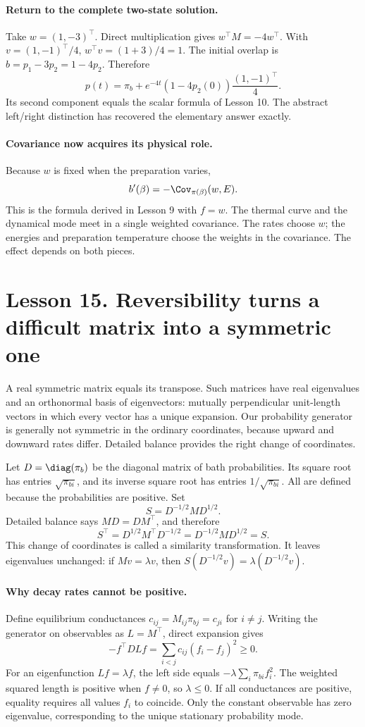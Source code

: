 \paragraph{Return to the complete two-state solution.}
Take $w=(1,-3)^\top$. Direct multiplication gives $w^\top M=-4w^\top$.
With $v=(1,-1)^\top/4$, $w^\top v=(1+3)/4=1$. The initial overlap is
$b=p_1-3p_2=1-4p_2$. Therefore
\[
p(t)=\pi_b+e^{-4t}(1-4p_2(0))\frac{(1,-1)^\top}{4}.
\]
Its second component equals the scalar formula of Lesson 10. The abstract
left/right distinction has recovered the elementary answer exactly.

\paragraph{Covariance now acquires its physical role.}
Because $w$ is fixed when the preparation varies,
\[
b'(\beta)=-\Cov_{\pi(\beta)}(w,E).
\]
This is the formula derived in Lesson 9 with $f=w$. The thermal curve and the
dynamical mode meet in a single weighted covariance. The rates choose $w$;
the energies and preparation temperature choose the weights in the covariance.
The effect depends on both pieces.

\clearpage
\section*{Lesson 15. Reversibility turns a difficult matrix into a symmetric one}
A real symmetric matrix equals its transpose. Such matrices have real
eigenvalues and an orthonormal basis of eigenvectors: mutually perpendicular
unit-length vectors in which every vector has a unique expansion. Our probability
generator is generally not symmetric in the ordinary coordinates, because
upward and downward rates differ. Detailed balance provides the right change
of coordinates.

Let $D=\diag(\pi_b)$ be the diagonal matrix of bath probabilities. Its square
root has entries $\sqrt{\pi_{bi}}$, and its inverse square root has entries
$1/\sqrt{\pi_{bi}}$. All are defined because the probabilities are positive.
Set
\[
S=D^{-1/2}MD^{1/2}.
\]
Detailed balance says $MD=DM^\top$, and therefore
\[
S^\top=D^{1/2}M^\top D^{-1/2}
=D^{-1/2}MD^{1/2}=S.
\]
This change of coordinates is called a similarity transformation. It leaves
eigenvalues unchanged: if $Mv=\lambda v$, then
$S(D^{-1/2}v)=\lambda(D^{-1/2}v)$.

\paragraph{Why decay rates cannot be positive.}
Define equilibrium conductances $c_{ij}=M_{ij}\pi_{bj}=c_{ji}$ for $i\ne j$.
Writing the generator on observables as $L=M^\top$, direct expansion gives
\[
-f^\top DLf=\sum_{i<j}c_{ij}(f_i-f_j)^2\geq0.
\]
For an eigenfunction $Lf=\lambda f$, the left side equals
$-\lambda\sum_i\pi_{bi}f_i^2$. The weighted squared length is positive
when $f\ne0$, so $\lambda\leq0$. If all conductances are positive, equality
requires all values $f_i$ to coincide. Only the constant observable has
zero eigenvalue, corresponding to the unique stationary probability mode.

